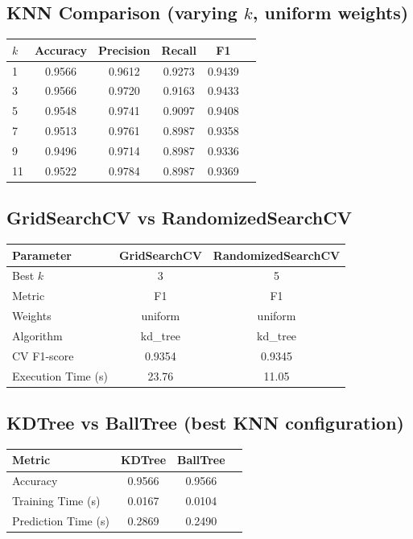 \documentclass[12pt,a4paper]{article}
\begin{document}
\subsection*{KNN Comparison (varying $k$, uniform weights)}
\begin{tabular}{lccccc}
\toprule
$k$ & Accuracy & Precision & Recall & F1 \\
\midrule
1  & 0.9566 & 0.9612 & 0.9273 & 0.9439 \\
3  & 0.9566 & 0.9720 & 0.9163 & 0.9433 \\
5  & 0.9548 & 0.9741 & 0.9097 & 0.9408 \\
7  & 0.9513 & 0.9761 & 0.8987 & 0.9358 \\
9  & 0.9496 & 0.9714 & 0.8987 & 0.9336 \\
11 & 0.9522 & 0.9784 & 0.8987 & 0.9369 \\
\bottomrule
\end{tabular}

\subsection*{GridSearchCV vs RandomizedSearchCV}
\begin{tabular}{lcc}
\toprule
Parameter & GridSearchCV & RandomizedSearchCV\\
\midrule
Best $k$ & 3 & 5 \\
Metric & F1 & F1 \\
Weights & uniform & uniform \\
Algorithm & kd\_tree & kd\_tree \\
CV F1-score & 0.9354 & 0.9345 \\
Execution Time (s) & 23.76 & 11.05 \\
\bottomrule
\end{tabular}

\subsection*{KDTree vs BallTree (best KNN configuration)}
\begin{tabular}{lccc}
\toprule
Metric & KDTree & BallTree \\
\midrule
Accuracy & 0.9566 & 0.9566 \\
Training Time (s) & 0.0167 & 0.0104 \\
Prediction Time (s) & 0.2869 & 0.2490 \\
\bottomrule
\end{tabular}
\end{document}
